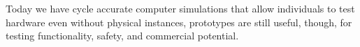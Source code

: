 Today we have cycle accurate computer simulations that allow individuals to test hardware even without physical instances, prototypes are still useful, though, for testing functionality, safety, and commercial potential.





